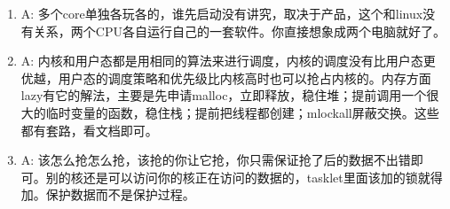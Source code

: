 \begin{enumerate}
  \item
\begin{tcolorbox}[colback=green!5,colframe=green!75!black]
\tcblower
A: 多个core单独各玩各的，谁先启动没有讲究，取决于产品，这个和linux没有关系，两个CPU各自运行自己的一套软件。你直接想象成两个电脑就好了。
\end{tcolorbox}



  \item
\begin{tcolorbox}[colback=green!5,colframe=green!75!black]
\tcblower
A: 内核和用户态都是用相同的算法来进行调度，内核的调度没有比用户态更优越，用户态的调度策略和优先级比内核高时也可以抢占内核的。内存方面lazy有它的解法，主要是先申请malloc，立即释放，稳住堆；提前调用一个很大的临时变量的函数，稳住栈；提前把线程都创建；mlockall屏蔽交换。这些都有套路，看文档即可。
\end{tcolorbox}



  \item
\begin{tcolorbox}[colback=green!5,colframe=green!75!black]
\tcblower
A: 该怎么抢怎么抢，该抢的你让它抢，你只需保证抢了后的数据不出错即可。别的核还是可以访问你的核正在访问的数据的，tasklet里面该加的锁就得加。保护数据而不是保护过程。
\end{tcolorbox}
\end{enumerate}

